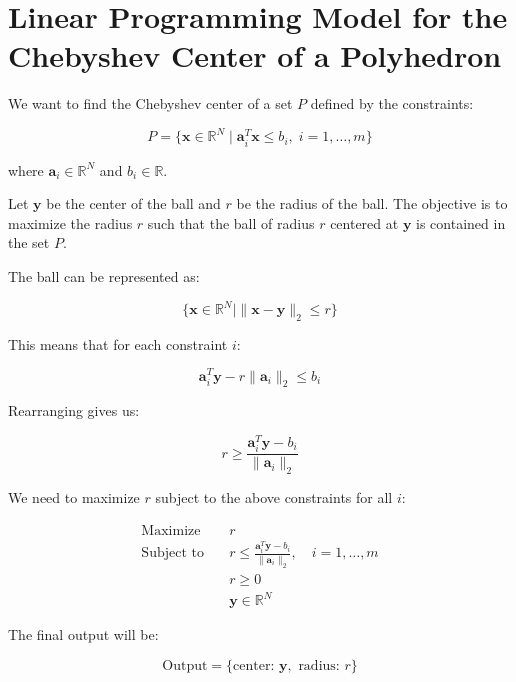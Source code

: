 \documentclass{article}
\begin{document}
\section*{Linear Programming Model for the Chebyshev Center of a Polyhedron}

We want to find the Chebyshev center of a set \( P \) defined by the constraints:

\[
P = \{ \mathbf{x} \in \mathbb{R}^N \mid \mathbf{a}_i^T \mathbf{x} \leq b_i, \; i = 1, \ldots, m \}
\]

where \( \mathbf{a}_i \in \mathbb{R}^N \) and \( b_i \in \mathbb{R} \).

Let \( \mathbf{y} \) be the center of the ball and \( r \) be the radius of the ball. The objective is to maximize the radius \( r \) such that the ball of radius \( r \) centered at \( \mathbf{y} \) is contained in the set \( P \).

The ball can be represented as:

\[
\{ \mathbf{x} \in \mathbb{R}^N \mid \|\mathbf{x} - \mathbf{y}\|_2 \leq r \}
\]

This means that for each constraint \( i \):

\[
\mathbf{a}_i^T \mathbf{y} - r \|\mathbf{a}_i\|_2 \leq b_i
\]

Rearranging gives us:

\[
r \geq \frac{\mathbf{a}_i^T \mathbf{y} - b_i}{\|\mathbf{a}_i\|_2}
\]

We need to maximize \( r \) subject to the above constraints for all \( i \):

\[
\begin{align*}
\text{Maximize} \quad & r \\
\text{Subject to} \quad & r \leq \frac{\mathbf{a}_i^T \mathbf{y} - b_i}{\|\mathbf{a}_i\|_2}, \quad i = 1, \ldots, m \\
& r \geq 0 \\
& \mathbf{y} \in \mathbb{R}^N
\end{align*}
\]

The final output will be:

\[
\text{Output} = \{ \text{center: } \mathbf{y}, \text{ radius: } r \}
\]
\end{document}
